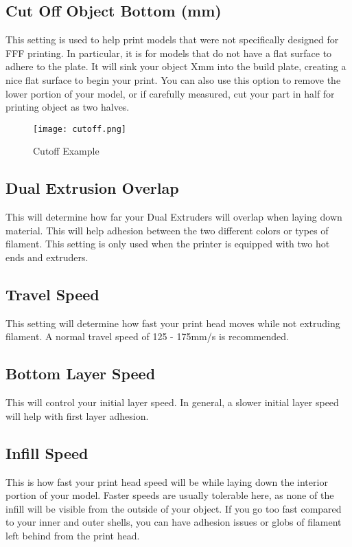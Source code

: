 \subsection{Cut Off Object Bottom (mm)}
This setting is used to help print models that were not specifically designed for FFF printing. In particular, it is for models that do not have a flat surface to adhere to the plate. It will sink your object Xmm into the build plate, creating a nice flat surface to begin your print. You can also use this option to remove the lower portion of your model, or if carefully measured, cut your part in half for printing object as two halves.
\begin{figure}[H]
\centering
\texttt{[image: cutoff.png]}
\caption{Cutoff Example}
\label{fig:Cutoff Example}
\end{figure}

\subsection{Dual Extrusion Overlap}
This will determine how far your Dual Extruders will overlap when laying down material. This will help adhesion between the two different colors or types of filament. This setting is only used when the printer is equipped with two hot ends and extruders.

\subsection{Travel Speed}
This setting will determine how fast your print head moves while not extruding filament. A normal travel speed of 125 - 175mm/s is recommended.

\subsection{Bottom Layer Speed}
This will control your initial layer speed. In general, a slower initial layer speed will help with first layer adhesion. 

\subsection{Infill Speed}
This is how fast your print head speed will be while laying down the interior portion of your model. Faster speeds are usually tolerable here, as none of the infill will be visible from the outside of your object. If you go too fast compared to your inner and outer shells, you can have adhesion issues or globs of filament left behind from the print head.

